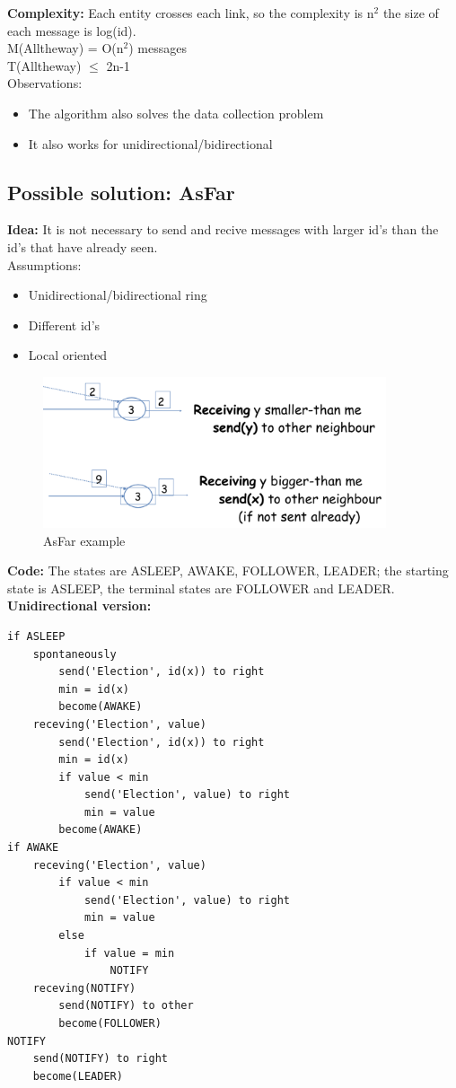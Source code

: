 \documentclass[paper=a4, fontsize=11pt]{scrartcl} %
\numberwithin{equation}{section} %
\numberwithin{figure}{section} %
\numberwithin{table}{section} %
\begin{document}
\textbf{Complexity:} Each entity crosses each link, so the complexity is n$^2$ the size of each message is log(id).\\
M(Alltheway) = O(n$^2$) messages\\
T(Alltheway) $\leq$ 2n-1\\
Observations:
\begin{itemize}
\item The algorithm also solves the data collection problem
\item It also works for unidirectional/bidirectional
\end{itemize}
\subsection*{Possible solution: AsFar}
\textbf{Idea:} It is not necessary to send and recive messages with larger id's than the id's that have already seen.\\
Assumptions:
\begin{itemize}
\item Unidirectional/bidirectional ring
\item Different id's
\item Local oriented
\end{itemize}
\begin{figure}[H]
  \centering
  \includegraphics[width=0.9\textwidth]{img/asfar.png}
  \caption{AsFar example}
  \label{fig:boat1}
\end{figure}
\textbf{Code:} The states are ASLEEP, AWAKE, FOLLOWER, LEADER; the starting state is ASLEEP, the terminal states are FOLLOWER and LEADER.\\
\textbf{Unidirectional version:}
\begin{lstlisting}
if ASLEEP
	spontaneously
		send('Election', id(x)) to right
		min = id(x)
		become(AWAKE)
	receving('Election', value)
		send('Election', id(x)) to right
		min = id(x)
		if value < min
			send('Election', value) to right
			min = value
		become(AWAKE)		
if AWAKE
	receving('Election', value)
		if value < min
			send('Election', value) to right
			min = value
		else
			if value = min
				NOTIFY
	receving(NOTIFY)
		send(NOTIFY) to other
		become(FOLLOWER)
NOTIFY
	send(NOTIFY) to right
	become(LEADER)						
\end{lstlisting}
\end{document}
